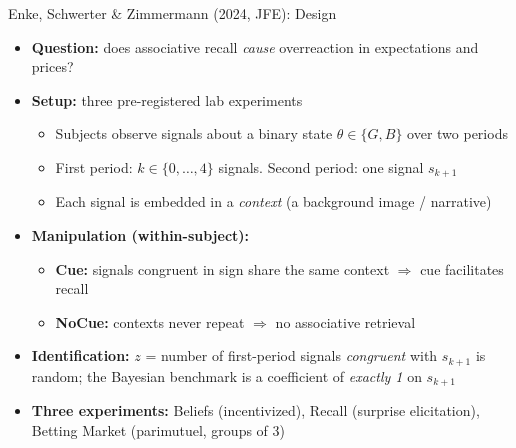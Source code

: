 \documentclass[aspectratio=169, 11pt]{beamer}
\begin{document}
\begin{frame}{Enke, Schwerter \& Zimmermann (2024, JFE): Design}
\begin{itemize}
\item \textbf{Question:} does associative recall \emph{cause} overreaction in expectations and prices?
\item \textbf{Setup:} three pre-registered lab experiments
  \begin{itemize}
  \item Subjects observe signals about a binary state $\theta\in\{G,B\}$ over two periods
  \item First period: $k\in\{0,\ldots,4\}$ signals. Second period: one signal $s_{k+1}$
  \item Each signal is embedded in a \emph{context} (a background image / narrative)
  \end{itemize}
\item \textbf{Manipulation (within-subject):}
  \begin{itemize}
  \item \textbf{Cue:} signals congruent in sign share the same context $\Rightarrow$ cue facilitates recall
  \item \textbf{NoCue:} contexts never repeat $\Rightarrow$ no associative retrieval
  \end{itemize}
\item \textbf{Identification:} $z$ = number of first-period signals \emph{congruent} with $s_{k+1}$ is random; the Bayesian benchmark is a coefficient of \emph{exactly 1} on $s_{k+1}$
\item \textbf{Three experiments:} Beliefs (incentivized), Recall (surprise elicitation), Betting Market (parimutuel, groups of 3)
\end{itemize}
\end{frame}
\end{document}
